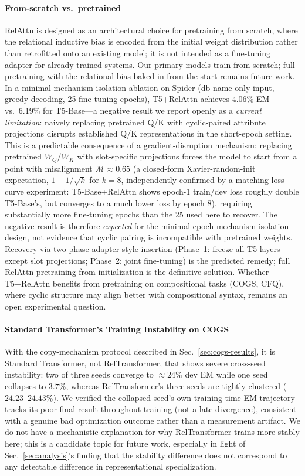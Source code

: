 \documentclass[review]{elsarticle}
\begin{document}
\paragraph{From-scratch vs.\ pretrained}
RelAttn is designed as an architectural choice for pretraining from scratch, where the relational inductive bias is encoded from the initial weight distribution rather than retrofitted onto an existing model; it is not intended as a fine-tuning adapter for already-trained systems. Our primary models train from scratch; full pretraining with the relational bias baked in from the start remains future work. In a minimal mechanism-isolation ablation on Spider (db-name-only input, greedy decoding, 25 fine-tuning epochs), T5+RelAttn achieves 4.06\% EM vs.\ 6.19\% for T5-Base---a negative result we report openly as a \emph{current limitation}: naively replacing pretrained Q/K with cyclic-paired attribute projections disrupts established Q/K representations in the short-epoch setting. This is a predictable consequence of a gradient-disruption mechanism: replacing pretrained $W_Q/W_K$ with slot-specific projections forces the model to start from a point with misalignment $\mathcal{M}{\approx}0.65$ (a closed-form Xavier-random-init expectation, $1-1/\sqrt{k}$ for $k{=}8$, independently confirmed by a matching loss-curve experiment: T5-Base+RelAttn shows epoch-1 train/dev loss roughly double T5-Base's, but converges to a much lower loss by epoch 8), requiring substantially more fine-tuning epochs than the 25 used here to recover. The negative result is therefore \emph{expected} for the minimal-epoch mechanism-isolation design, not evidence that cyclic pairing is incompatible with pretrained weights. Recovery via two-phase adapter-style insertion (Phase~1: freeze all T5 layers except slot projections; Phase~2: joint fine-tuning) is the predicted remedy; full RelAttn pretraining from initialization is the definitive solution. Whether T5+RelAttn benefits from pretraining on compositional tasks (COGS, CFQ), where cyclic structure may align better with compositional syntax, remains an open experimental question.

\paragraph{Standard Transformer's Training Instability on COGS}
With the copy-mechanism protocol described in Sec.~\ref{sec:cogs-results}, it is Standard Transformer, not RelTransformer, that shows severe cross-seed instability: two of three seeds converge to $\approx24\%$ dev EM while one seed collapses to $3.7\%$, whereas RelTransformer's three seeds are tightly clustered ($24.23$--$24.43\%$). We verified the collapsed seed's own training-time EM trajectory tracks its poor final result throughout training (not a late divergence), consistent with a genuine bad optimization outcome rather than a measurement artifact. We do not have a mechanistic explanation for why RelTransformer trains more stably here; this is a candidate topic for future work, especially in light of Sec.~\ref{sec:analysis}'s finding that the stability difference does not correspond to any detectable difference in representational specialization.
\end{document}
